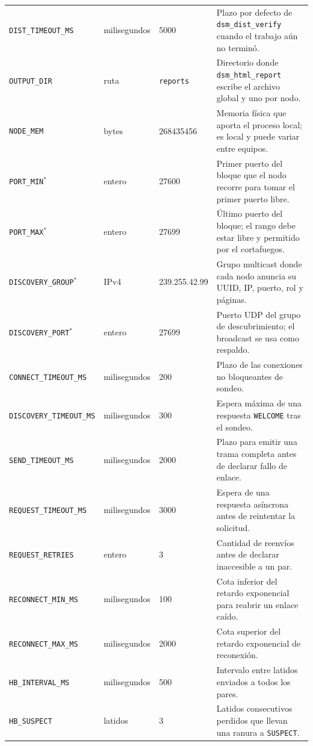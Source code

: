 {\begin{xltabular}{\linewidth}{@{}l l l Y@{}}
\texttt{DIST\_TIMEOUT\_MS} & milisegundos & 5000 & Plazo por defecto de \texttt{dsm\_dist\_verify} cuando el trabajo aún no terminó. \\
\texttt{OUTPUT\_DIR} & ruta & \texttt{reports} & Directorio donde \texttt{dsm\_html\_report} escribe el archivo global y uno por nodo. \\
\texttt{NODE\_MEM} & bytes & 268435456 & Memoria física que aporta el proceso local; es local y puede variar entre equipos. \\
\texttt{PORT\_MIN}$^{\ast}$ & entero & 27600 & Primer puerto del bloque que el nodo recorre para tomar el primer puerto libre. \\
\texttt{PORT\_MAX}$^{\ast}$ & entero & 27699 & Último puerto del bloque; el rango debe estar libre y permitido por el cortafuegos. \\
\texttt{DISCOVERY\_GROUP}$^{\ast}$ & IPv4 & 239.255.42.99 & Grupo multicast donde cada nodo anuncia su UUID, IP, puerto, rol y páginas. \\
\texttt{DISCOVERY\_PORT}$^{\ast}$ & entero & 27699 & Puerto UDP del grupo de descubrimiento; el broadcast se usa como respaldo. \\
\texttt{CONNECT\_TIMEOUT\_MS} & milisegundos & 200 & Plazo de las conexiones no bloqueantes de sondeo. \\
\texttt{DISCOVERY\_TIMEOUT\_MS} & milisegundos & 300 & Espera máxima de una respuesta \texttt{WELCOME} tras el sondeo. \\
\texttt{SEND\_TIMEOUT\_MS} & milisegundos & 2000 & Plazo para emitir una trama completa antes de declarar fallo de enlace. \\
\texttt{REQUEST\_TIMEOUT\_MS} & milisegundos & 3000 & Espera de una respuesta asíncrona antes de reintentar la solicitud. \\
\texttt{REQUEST\_RETRIES} & entero & 3 & Cantidad de reenvíos antes de declarar inaccesible a un par. \\
\texttt{RECONNECT\_MIN\_MS} & milisegundos & 100 & Cota inferior del retardo exponencial para reabrir un enlace caído. \\
\texttt{RECONNECT\_MAX\_MS} & milisegundos & 2000 & Cota superior del retardo exponencial de reconexión. \\
\texttt{HB\_INTERVAL\_MS} & milisegundos & 500 & Intervalo entre latidos enviados a todos los pares. \\
\texttt{HB\_SUSPECT} & latidos & 3 & Latidos consecutivos perdidos que llevan una ranura a \texttt{SUSPECT}. \\

\end{xltabular}}

